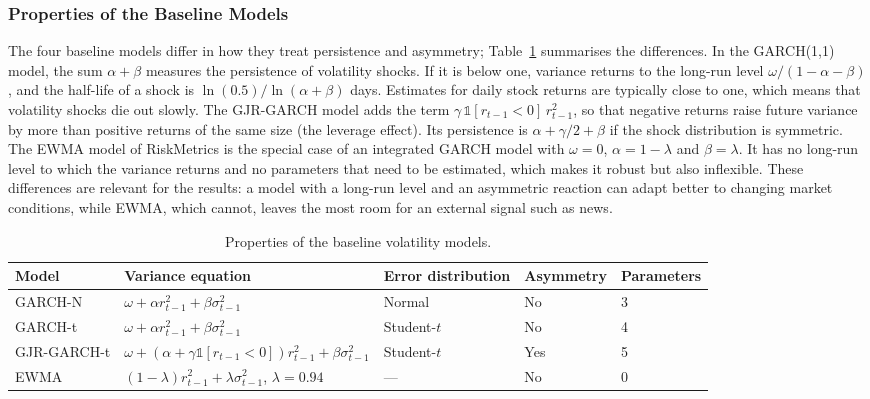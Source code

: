 \documentclass[12pt,a4paper]{article}
\begin{document}
\subsubsection{Properties of the Baseline Models}\label{sec:model-properties}
The four baseline models differ in how they treat persistence and asymmetry; Table~\ref{tab:models} summarises the differences. In the GARCH(1,1) model, the sum $\alpha+\beta$ measures the persistence of volatility shocks. If it is below one, variance returns to the long-run level $\omega/(1-\alpha-\beta)$, and the half-life of a shock is $\ln(0.5)/\ln(\alpha+\beta)$ days. Estimates for daily stock returns are typically close to one, which means that volatility shocks die out slowly. The GJR-GARCH model adds the term $\gamma\,\mathbb{1}[r_{t-1}<0]\,r_{t-1}^2$, so that negative returns raise future variance by more than positive returns of the same size (the leverage effect). Its persistence is $\alpha+\gamma/2+\beta$ if the shock distribution is symmetric. The EWMA model of RiskMetrics \parencite{riskmetrics1996} is the special case of an integrated GARCH model with $\omega=0$, $\alpha=1-\lambda$ and $\beta=\lambda$. It has no long-run level to which the variance returns and no parameters that need to be estimated, which makes it robust but also inflexible. These differences are relevant for the results: a model with a long-run level and an asymmetric reaction can adapt better to changing market conditions, while EWMA, which cannot, leaves the most room for an external signal such as news.

\begin{table}[htbp]
  \centering\small
  \caption[Properties of the baseline models]{Properties of the baseline volatility models.}
  \label{tab:models}
  \begin{tabular}{p{2.2cm}p{4.5cm}p{2.4cm}p{2.2cm}p{2.2cm}}
    \toprule
    Model & Variance equation & Error distribution & Asymmetry & Parameters \\
    \midrule
    GARCH-N & $\omega+\alpha r_{t-1}^2+\beta\sigma_{t-1}^2$ & Normal & No & 3 \\
    GARCH-t & $\omega+\alpha r_{t-1}^2+\beta\sigma_{t-1}^2$ & Student-$t$ & No & 4 \\
    GJR-GARCH-t & $\omega+(\alpha+\gamma\mathbb{1}[r_{t-1}<0])r_{t-1}^2+\beta\sigma_{t-1}^2$ & Student-$t$ & Yes & 5 \\
    EWMA & $(1-\lambda)r_{t-1}^2+\lambda\sigma_{t-1}^2$, $\lambda=0.94$ & --- & No & 0 \\
    \bottomrule
  \end{tabular}
\end{table}
\end{document}

